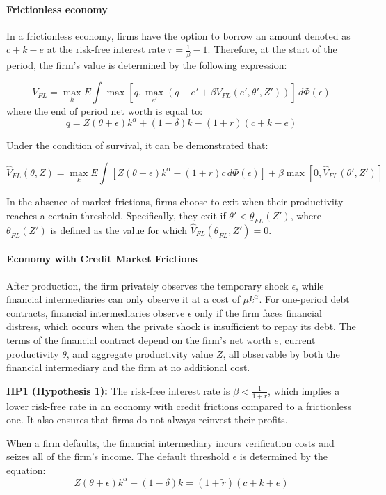 \documentclass[12pt]{article}
\begin{document}
\paragraph{Frictionless economy}
In a frictionless economy, firms have the option to borrow an amount denoted as \(c+k-e\) at the risk-free interest rate
\(r=\frac{1}{\beta}-1\). Therefore, at the start of the period, the firm's value is determined by the following
expression:

\[V_{FL} = \max_{k} E \int \max[q,\max_{e'}(q - e' + \beta V_{FL}(e',\theta', Z'))]  \,d\Phi
(\epsilon) \]
where the end of period net worth is equal to:
\[q=Z(\theta+\epsilon)k^\alpha + (1-\delta )k-(1+r)(c+k-e)\]

Under the condition of survival, it can be demonstrated that:

\[\widehat{V}_{FL}(\theta,Z) = \max_{k}E\int[Z(\theta+\epsilon)k^\alpha - (1+r)c\,d\Phi (\epsilon)] +
\beta\max[0,\widehat{V}_{FL}(\theta',Z')]\]

In the absence of market frictions, firms choose to exit when their productivity reaches a certain threshold.
Specifically, they exit if \(\theta'<\underline{\theta} _{FL}(Z')\), where \(\underline{\theta}
_{FL}(Z')\) is defined as the value
for which \(\widehat{V}_{FL}(\underline{\theta}_{FL},Z')=0\).

\paragraph{Economy with Credit Market Frictions}

After production, the firm privately observes the temporary shock $\epsilon$, while financial intermediaries can only
observe it at a cost of $\mu k^\alpha$. For one-period debt contracts, financial intermediaries observe $\epsilon$ only
if the firm faces financial distress, which occurs when the private shock is insufficient to repay its debt. The terms
of the financial contract depend on the firm's net worth $e$, current productivity $\theta$, and aggregate productivity
value $Z$, all observable by both the financial intermediary and the firm at no additional cost.

\textbf{HP1 (Hypothesis 1):} The risk-free interest rate is $\beta < \frac{1}{1+r}$, which implies a lower risk-free
rate in an economy with credit frictions compared to a frictionless one. It also ensures that firms do not always
reinvest their profits.

When a firm defaults, the financial intermediary incurs verification costs and seizes all of the firm's income. The
default threshold $\overline{\epsilon}$ is determined by the equation:
\[
Z(\theta+\overline{\epsilon})k^\alpha + (1-\delta)k = (1+\widetilde{r} )(c+k+e)
\]
\end{document}
